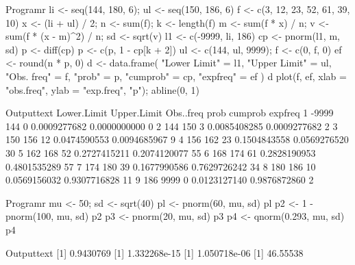 \begin{code}
    {Program}{r}
li <- seq(144, 180, 6); ul <- seq(150, 186, 6)
f <- c(3, 12, 23, 52, 61, 39, 10)
x <- (li + ul) / 2; n <- sum(f); k <- length(f)
m <- sum(f * x) / n; v <- sum(f * (x - m)^2) / n; sd <- sqrt(v)
l1 <- c(-9999, li, 186)
cp <- pnorm(l1, m, sd)
p <- diff(cp)
p <- c(p, 1 - cp[k + 2])
ul <- c(144, ul, 9999); f <- c(0, f, 0)
ef <- round(n * p, 0)
d <- data.frame(
  "Lower Limit" = l1, "Upper Limit" = ul, "Obs. freq" = f,
  "prob" = p, "cumprob" = cp, "expfreq" = ef
)
d
plot(f, ef, xlab = "obs.freq", ylab = "exp.freq", "p"); abline(0, 1)
\end{code}
\begin{code}
    {Output}{text}
 Lower.Limit Upper.Limit Obs..freq         prob      cumprob expfreq
1       -9999         144         0 0.0009277682 0.0000000000       0
2         144         150         3 0.0085408285 0.0009277682       2
3         150         156        12 0.0474590553 0.0094685967       9
4         156         162        23 0.1504843558 0.0569276520      30
5         162         168        52 0.2727415211 0.2074120077      55
6         168         174        61 0.2828190953 0.4801535289      57
7         174         180        39 0.1677990586 0.7629726242      34
8         180         186        10 0.0569156032 0.9307716828      11
9         186        9999         0 0.0123127140 0.9876872860       2
\end{code}
\newpage
{}

\begin{code}
    {Program}{r}
mu <- 50; sd <- sqrt(40)
pl <- pnorm(60, mu, sd)
pl
p2 <- 1 - pnorm(100, mu, sd)
p2
p3 <- pnorm(20, mu, sd)
p3
p4 <- qnorm(0.293, mu, sd)
p4
\end{code}
\begin{code}
    {Output}{text}
[1] 0.9430769
[1] 1.332268e-15
[1] 1.050718e-06
[1] 46.55538
\end{code}
